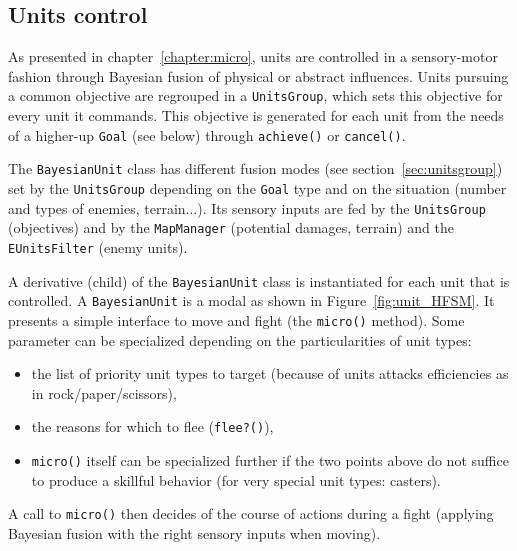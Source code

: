 \subsection{Units control}
\label{sec:micromanagementcode}

As presented in chapter~\ref{chapter:micro}, units are controlled in a sensory-motor fashion through Bayesian fusion of physical or abstract influences. Units pursuing a common objective are regrouped in a \texttt{UnitsGroup}, which sets this objective for every unit it commands. This objective is generated for each unit from the needs of a higher-up \texttt{Goal} (see below) through \texttt{achieve()} or \texttt{cancel()}.

The \texttt{BayesianUnit} class has different fusion modes (see section~\ref{sec:unitsgroup}) set by the \texttt{UnitsGroup} depending on the \texttt{Goal} type and on the situation (number and types of enemies, terrain...). Its sensory inputs are fed by the \texttt{UnitsGroup} (objectives) and by the \texttt{MapManager} (potential damages, terrain) and the \texttt{EUnitsFilter} (enemy units).

A derivative (child) of the \texttt{BayesianUnit} class is instantiated for each unit that is controlled. A \texttt{BayesianUnit} is a modal  as shown in Figure~\ref{fig:unit_HFSM}. It presents a simple interface to move and fight (the \texttt{micro()} method). Some parameter can be specialized depending on the particularities of unit types:
\begin{itemize}
    \item the list of priority unit types to target (because of units attacks efficiencies as in rock/paper/scissors),
    \item the reasons for which to flee (\texttt{flee?()}),
    \item \texttt{micro()} itself can be specialized further if the two points above do not suffice to produce a skillful behavior (for very special unit types: casters).
\end{itemize}
A call to \texttt{micro()} then decides of the course of actions during a fight (applying Bayesian fusion with the right sensory inputs when moving).


